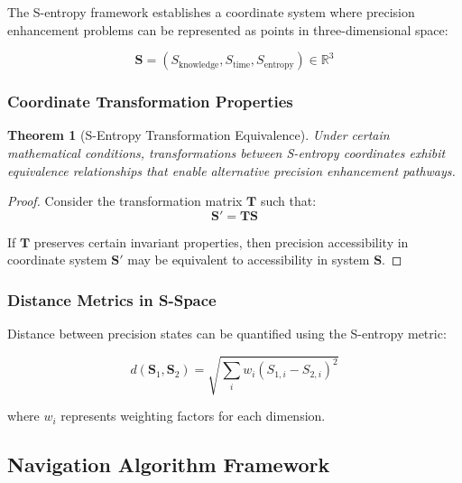 \documentclass[12pt,a4paper]{article}
\newtheorem{theorem}{Theorem}[section]
\begin{document}
{The S-entropy framework establishes a coordinate system where precision enhancement problems can be represented as points in three-dimensional space:

\begin{equation}
\mathbf{S} = (S_{\text{knowledge}}, S_{\text{time}}, S_{\text{entropy}}) \in \mathbb{R}^3
\label{eq:tri_dimensional_coordinates}
\end{equation}

\subsubsection{Coordinate Transformation Properties}

\begin{theorem}[S-Entropy Transformation Equivalence]
Under certain mathematical conditions, transformations between S-entropy coordinates exhibit equivalence relationships that enable alternative precision enhancement pathways.
\end{theorem}

\begin{proof}
Consider the transformation matrix $\mathbf{T}$ such that:
\begin{equation}
\mathbf{S}' = \mathbf{T} \mathbf{S}
\label{eq:coordinate_transformation}
\end{equation}

If $\mathbf{T}$ preserves certain invariant properties, then precision accessibility in coordinate system $\mathbf{S}'$ may be equivalent to accessibility in system $\mathbf{S}$.
\end{proof}

\subsubsection{Distance Metrics in S-Space}

Distance between precision states can be quantified using the S-entropy metric:

\begin{equation}
d(\mathbf{S}_1, \mathbf{S}_2) = \sqrt{\sum_{i} w_i (S_{1,i} - S_{2,i})^2}
\label{eq:s_entropy_distance}
\end{equation}

where $w_i$ represents weighting factors for each dimension.

\subsection{Navigation Algorithm Framework}

}
\end{document}
